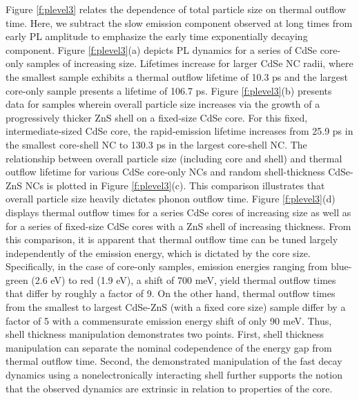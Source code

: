 Figure \ref{f:plevel3} relates the dependence of total particle size on thermal outflow time. Here, we subtract the slow emission component observed at long times from early PL amplitude to emphasize the early time exponentially decaying component. Figure \ref{f:plevel3}(a) depicts PL dynamics for a series of CdSe core-only samples of increasing size. Lifetimes increase for larger CdSe NC radii, where the smallest sample exhibits a thermal outflow lifetime of 10.3 ps and the largest core-only sample presents a lifetime of 106.7 ps. Figure \ref{f:plevel3}(b) presents data for samples wherein overall particle size increases via the growth of a progressively thicker ZnS shell on a fixed-size CdSe core. For this fixed, intermediate-sized CdSe core, the rapid-emission lifetime increases from 25.9 ps in the smallest core-shell NC to 130.3 ps in the largest core-shell NC. The relationship between overall particle size (including core and shell) and thermal outflow lifetime for various CdSe core-only NCs and random shell-thickness CdSe-ZnS NCs is plotted in Figure \ref{f:plevel3}(c). This comparison illustrates that overall particle size heavily dictates phonon outflow time. Figure \ref{f:plevel3}(d) displays thermal outflow times for a series CdSe cores of increasing size as well as for a series of fixed-size CdSe cores with a ZnS shell of increasing thickness. From this comparison, it is apparent that thermal outflow time can be tuned largely independently of the emission energy, which is dictated by the core size. Specifically, in the case of core-only samples, emission energies ranging from blue-green (2.6 eV) to red (1.9 eV), a shift of 700 meV, yield thermal outflow times that differ by roughly a factor of 9. On the other hand, thermal outflow times from the smallest to largest CdSe-ZnS (with a fixed core size) sample differ by a factor of 5 with a commensurate emission energy shift of only 90 meV. Thus, shell thickness manipulation demonstrates two points. First, shell thickness manipulation can separate the nominal codependence of the energy gap from thermal outflow time. Second, the demonstrated manipulation of the fast decay dynamics using a nonelectronically interacting shell further supports the notion that the observed dynamics are extrinsic in relation to properties of the core. \par

